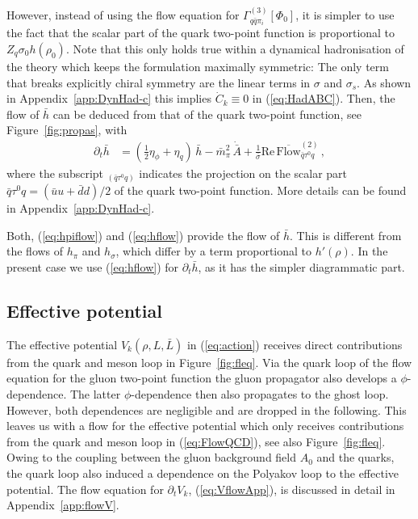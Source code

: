 \documentclass[%
reprint,
superscriptaddress,
showpacs,preprintnumbers,
 amsmath,amssymb,
 aps,
prd,
]{revtex4-1}
\def\Fig#1{Figure~\ref{#1}}
\def\eq#1{(\ref{#1})}
\def\fig#1{Figure~\ref{#1}}
\def\app#1{Appendix~\ref{#1}}
\begin{document}
However, instead of using the flow equation for
$\Gamma^{(3)}_{q \bar q \pi_i}[\Phi_0]$, it is simpler to use the fact
that the scalar part of the quark two-point function is proportional
to $ Z_q \sigma_0 h(\rho_0)$. Note that this only holds true within a
dynamical hadronisation of the theory which keeps the formulation
maximally symmetric: The only term that breaks explicitly chiral
symmetry are the linear terms in $\sigma$ and $\sigma_s$.  As shown in
\app{app:DynHad-c} this implies ${\dot C}_k\equiv 0$ in
\eq{eq:HadABC}. Then, the flow of $\bar h$ can be deduced from that of
the quark two-point function, see \fig{fig:propas}, with
%
\begin{align}
  \partial_t \bar{h}
  &=\left( \frac12 \eta_{\phi}+\eta_{q}\right)\,\bar{h}-
    \bar m^2_\pi\,\dot{\bar{A}}+
    \frac{1}{\bar \sigma}\mathrm{Re} \,
    \overline{\textrm{Flow}}^{(2)}_{\bar q \tau^0 q}
    \,,\label{eq:hflow}
\end{align}
%
where the subscript ${}_{(\bar q \tau^0 q)}$ indicates the projection
on the scalar part $\bar q \tau^0 q= (\bar u u+\bar d d)/2$ of the
quark two-point function. More details can be found in
\app{app:DynHad-c}.

Both, \eq{eq:hpiflow} and \eq{eq:hflow} provide the flow of $\bar
h$. This is different from the flows of $h_\pi$ and $h_\sigma$, which
differ by a term proportional to $h'(\rho)$. In the present case we
use \eq{eq:hflow} for $\partial_t \bar h$, as it has the simpler
diagrammatic part.


\subsection{Effective potential}\label{sec:EffPot}

The effective potential $V_{k}(\rho,L,\bar L)$ in \eq{eq:action}
receives direct contributions from the quark and meson loop in
\Fig{fig:fleq}. Via the quark loop of the flow equation for the gluon
two-point function the gluon propagator also develops a
$\phi$-dependence. The latter $\phi$-dependence then also propagates
to the ghost loop. However, both dependences are negligible and are
dropped in the following. This leaves us with a flow for the effective
potential which only receives contributions from the quark and meson
loop in \eq{eq:FlowQCD}, see also \fig{fig:fleq}. Owing to the
coupling between the gluon background field $A_0$ and the quarks, the
quark loop also induced a dependence on the Polyakov loop to the
effective potential. The flow equation for $\partial_t V_k$,
\eq{eq:VflowApp}, is discussed in detail in \app{app:flowV}.
\end{document}
